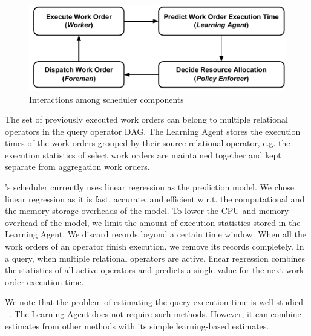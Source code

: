\begin{figure}[h]
	\centering
	\includegraphics[width=\linewidth]{figures/Compact-SchedulerCycle.pdf}
	\vspace{-2em}
	\caption{Interactions among scheduler components}
	\label{fig:scheduler-cycle}
\end{figure}

The set of previously executed work orders can belong to multiple relational operators in the query operator DAG. 
The Learning Agent stores the execution times of the work orders grouped by their source relational operator, e.g. the execution statistics of select work orders are maintained together and kept separate from aggregation work orders. 

\sys{}'s scheduler currently uses linear regression as the prediction model.
We chose linear regression as it is fast, accurate, and efficient w.r.t. the computational and the memory storage overheads of the model. 
To lower the CPU and memory overhead of the model, we limit the amount of execution statistics stored in the Learning Agent.
We discard records beyond a certain time window. 
When all the work orders of an operator finish execution, we remove its records completely. 
In a query, when multiple relational operators are active, 
linear regression combines the statistics of all active operators and predicts a single 
value for the next work order execution time.

We note that the problem of estimating the query execution time is well-studied 
~\cite{duggan2011performance, wu2013towards, li2012gslpi, 
chaudhuri2004estimating}. 
The Learning Agent does not require such methods. 
However, it can combine estimates from other methods with its simple learning-based estimates.
